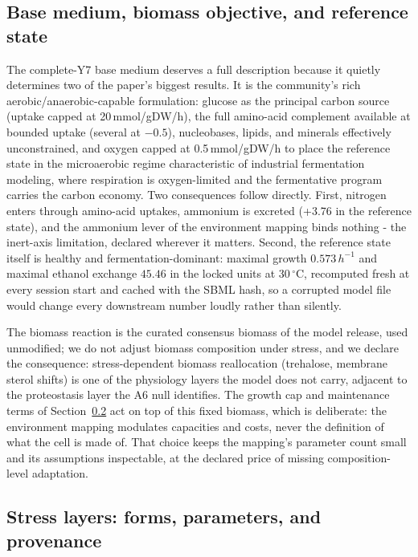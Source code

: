 \documentclass[12pt]{article}
\begin{document}
\subsection{Base medium, biomass objective, and reference state}
\label{sec:basemedium}

The complete-Y7 base medium deserves a full description because it
quietly determines two of the paper's biggest results. It is the
community's rich aerobic/anaerobic-capable formulation: glucose as
the principal carbon source (uptake capped at 20\,mmol/gDW/h), the
full amino-acid complement available at bounded uptake (several at
$-0.5$), nucleobases, lipids, and minerals effectively unconstrained,
and oxygen capped at 0.5\,mmol/gDW/h to place the reference state in
the microaerobic regime characteristic of industrial fermentation
modeling, where respiration is oxygen-limited and the fermentative
program carries the carbon economy. Two consequences follow directly.
First, nitrogen enters through amino-acid uptakes, ammonium is
excreted (+3.76 in the reference state), and the ammonium lever of
the environment mapping binds nothing - the inert-axis limitation,
declared wherever it matters. Second, the reference state itself is
healthy and fermentation-dominant: maximal growth
$0.573\,h^{-1}$ and maximal ethanol exchange $45.46$ in the locked
units at 30\,$^{\circ}$C, recomputed fresh at every session start and
cached with the SBML hash, so a corrupted model file would change
every downstream number loudly rather than silently.

The biomass reaction is the curated consensus biomass of the model
release, used unmodified; we do not adjust biomass composition under
stress, and we declare the consequence: stress-dependent biomass
reallocation (trehalose, membrane sterol shifts) is one of the
physiology layers the model does not carry, adjacent to the
proteostasis layer the A6 null identifies. The growth cap and
maintenance terms of Section~\ref{sec:stresslayers} act on top of
this fixed biomass, which is deliberate: the environment mapping
modulates capacities and costs, never the definition of what the
cell is made of. That choice keeps the mapping's parameter count
small and its assumptions inspectable, at the declared price of
missing composition-level adaptation.

\subsection{Stress layers: forms, parameters, and provenance}
\label{sec:stresslayers}
\end{document}
